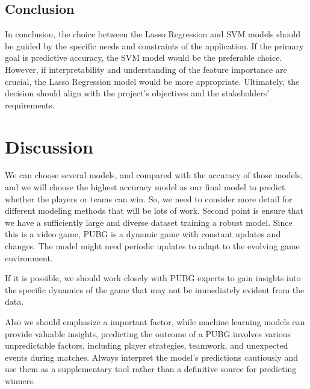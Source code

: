 \documentclass[12pt]{article}
\begin{document}
\subsection{Conclusion}
In conclusion, the choice between the Lasso Regression and SVM models should be guided by the specific needs and constraints of the application. If the primary goal is predictive accuracy, the SVM model would be the preferable choice. However, if interpretability and understanding of the feature importance are crucial, the Lasso Regression model would be more appropriate. Ultimately, the decision should align with the project's objectives and the stakeholders' requirements.



\section{Discussion}
\label{sec:disc}

We can choose several models, and compared with the accuracy of those models, and we will choose the highest accuracy model as our final model to predict whether the players or teams can win. So, we need to consider more detail for different modeling methods that will be lots of work.
Second point is ensure that we have a sufficiently large and diverse dataset training a robust model.
Since this is a video game, PUBG is a dynamic game with constant updates and changes. The model might need periodic updates to adapt to the evolving game environment.

If it is possible, we should work closely with PUBG experts to gain insights into the specific dynamics of the game that may not be immediately evident from the data.

Also we should emphasize a important factor, while machine learning models can provide valuable insights, predicting the outcome of a PUBG  involves various unpredictable factors, including player strategies, teamwork, and unexpected events during matches. Always interpret the model's predictions cautiously and use them as a supplementary tool rather than a definitive source for predicting winners.
\end{document}
